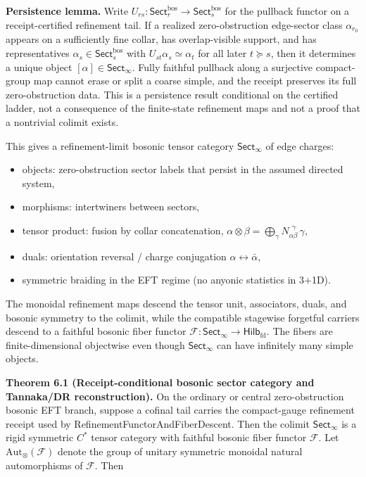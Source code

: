 \textbf{Persistence lemma.} Write \(U_{rs}:\mathsf{Sect}^{\mathrm{bos}}_r\to\mathsf{Sect}^{\mathrm{bos}}_s\) for the pullback functor on a receipt-certified refinement tail. If a realized zero-obstruction edge-sector class \(\alpha_{r_0}\) appears on a sufficiently fine collar, has overlap-visible support, and has representatives \(\alpha_s\in\mathsf{Sect}^{\mathrm{bos}}_s\) with \(U_{st}\alpha_s\simeq\alpha_t\) for all later \(t\succeq s\), then it determines a unique object \([\alpha]\in\mathsf{Sect}_\infty\). Fully faithful pullback along a surjective compact-group map cannot erase or split a coarse simple, and the receipt preserves its full zero-obstruction data. This is a persistence result conditional on the certified ladder, not a consequence of the finite-state refinement maps and not a proof that a nontrivial colimit exists.

This gives a refinement-limit bosonic tensor category \(\mathsf{Sect}_\infty\) of edge charges:

\begin{itemize}
\tightlist
\item
  objects: zero-obstruction sector labels that persist in the assumed directed system,
\item
  morphisms: intertwiners between sectors,
\item
  tensor product: fusion by collar concatenation, \(\alpha \otimes \beta = \bigoplus_\gamma N_{\alpha\beta}^{\ \ \gamma}\,\gamma\),
\item
  duals: orientation reversal / charge conjugation \(\alpha \leftrightarrow \bar\alpha\),
\item
  symmetric braiding in the EFT regime (no anyonic statistics in 3+1D).
\end{itemize}

The monoidal refinement maps descend the tensor unit, associators, duals, and bosonic symmetry to the colimit, while the compatible stagewise forgetful carriers descend to a faithful bosonic fiber functor \(\mathcal F: \mathsf{Sect}_\infty \to \mathsf{Hilb}_{\mathrm{fd}}\). The fibers are finite-dimensional objectwise even though \(\mathsf{Sect}_\infty\) can have infinitely many simple objects.

\textbf{Theorem 6.1 (Receipt-conditional bosonic sector category and Tannaka/DR reconstruction).} On the ordinary or central zero-obstruction bosonic EFT branch, suppose a cofinal tail carries the compact-gauge refinement receipt used by RefinementFunctorAndFiberDescent. Then the colimit \(\mathsf{Sect}_\infty\) is a rigid symmetric \(C^*\) tensor category with faithful bosonic fiber functor \(\mathcal F\). Let \(\mathrm{Aut}_\otimes(\mathcal F)\) denote the group of unitary symmetric monoidal natural automorphisms of \(\mathcal F\). Then

